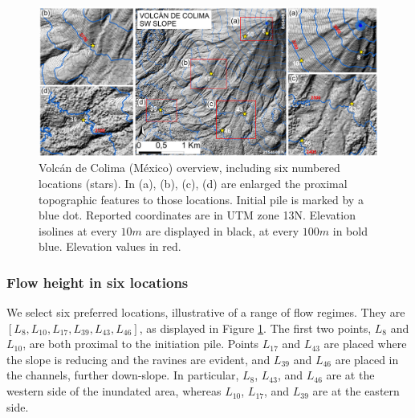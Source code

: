 \documentclass{article}
\begin{document}
\begin{figure}[H]
         \centering
        \includegraphics[width=1\textwidth]{figures/Colima/FigExtra.jpg}
        \caption{Volc{\'a}n de Colima (M{\'e}xico) overview, including six numbered locations (stars). In (a), (b), (c), (d) are enlarged the proximal topographic features to those locations. Initial pile is marked by a blue dot. Reported coordinates are in UTM zone 13N. Elevation isolines at every $10 m$ are displayed in black, at every $100m$ in bold blue. Elevation values in red.}
        \label{fig:Colima-extra}
\end{figure}

\subsubsection{Flow height in six locations}\label{Obs2}
We select six preferred locations, illustrative of a range of flow regimes. They are $[L_8, L_{10}, L_{17}, L_{39}, L_{43}, L_{46}]$, as displayed in Figure \ref{fig:Colima-extra}. The first two points, $L_8$ and $L_{10}$, are both proximal to the initiation pile. Points $L_{17}$ and $L_{43}$ are placed where the slope is reducing and the ravines are evident, and $L_{39}$ and $L_{46}$ are placed in the channels, further down-slope. In particular, $L_8$, $L_{43}$, and $L_{46}$ are at the western side of the inundated area, whereas $L_{10}$, $L_{17}$, and $L_{39}$ are at the eastern side.
\end{document}
